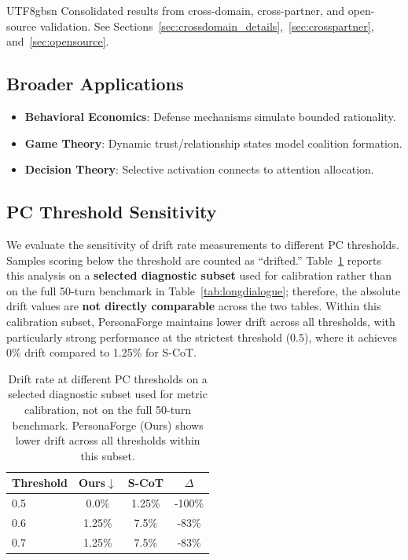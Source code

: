 \documentclass[11pt]{article}
\begin{document}
\begin{CJK*}{UTF8}{gbsn}
Consolidated results from cross-domain, cross-partner, and open-source validation. See Sections~\ref{sec:crossdomain_details},~\ref{sec:crosspartner}, and~\ref{sec:opensource}.

\subsection{Broader Applications}
\label{sec:broader}

\begin{itemize}
    \item \textbf{Behavioral Economics}: Defense mechanisms simulate bounded rationality.
    \item \textbf{Game Theory}: Dynamic trust/relationship states model coalition formation.
    \item \textbf{Decision Theory}: Selective activation connects to attention allocation.
\end{itemize}

\subsection{PC Threshold Sensitivity}
\label{sec:threshold_sensitivity}

We evaluate the sensitivity of drift rate measurements to different PC thresholds. Samples scoring below the threshold are counted as ``drifted.'' Table~\ref{tab:threshold} reports this analysis on a \textbf{selected diagnostic subset} used for calibration rather than on the full 50-turn benchmark in Table~\ref{tab:longdialogue}; therefore, the absolute drift values are \textbf{not directly comparable} across the two tables. Within this calibration subset, PersonaForge maintains lower drift across all thresholds, with particularly strong performance at the strictest threshold (0.5), where it achieves 0\% drift compared to 1.25\% for S-CoT.

\begin{table}[h]
\centering
\small
\begin{tabular}{lccc}
\toprule
\textbf{Threshold} & \textbf{Ours$\downarrow$} & \textbf{S-CoT} & \textbf{$\Delta$} \\
\midrule
0.5 & 0.0\% & 1.25\% & -100\% \\
0.6 & 1.25\% & 7.5\% & -83\% \\
0.7 & 1.25\% & 7.5\% & -83\% \\
\bottomrule
\end{tabular}
\caption{Drift rate at different PC thresholds on a selected diagnostic subset used for metric calibration, not on the full 50-turn benchmark. PersonaForge (Ours) shows lower drift across all thresholds within this subset.}
\label{tab:threshold}
\end{table}


\end{CJK*}
\end{document}
